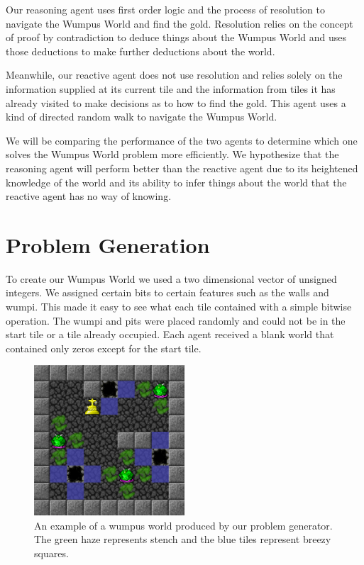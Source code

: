 \documentclass{article}
\begin{document}
		 Our reasoning agent uses first order logic and the process of resolution to navigate the Wumpus World and find the gold. Resolution relies on the concept of proof by contradiction to deduce things about the Wumpus World and uses those deductions to make further deductions about the world.
		 
		 Meanwhile, our reactive agent does not use resolution and relies solely on the information supplied at its current tile and the information from tiles it has already visited to make decisions as to how to find the gold. This agent uses a kind of directed random walk to navigate the Wumpus World.
		 
		 We will be comparing the performance of the two agents to determine which one solves the Wumpus World problem more efficiently. We hypothesize that the reasoning agent will perform better than the reactive agent due to its heightened knowledge of the world and its ability to infer things about the world that the reactive agent has no way of knowing.
		 


\section{Problem Generation}
To create our Wumpus World we used a two dimensional vector of unsigned integers. We assigned certain bits to certain features such as the walls and wumpi. This made it easy to see what each tile contained with a simple bitwise operation. The wumpi and pits were placed randomly and could not be in the start tile or a tile already occupied. Each agent received a blank world that contained only zeros except for the start tile.
\begin{figure}
	\centering
	\includegraphics[width=0.5\textwidth]{images/ex_ww}
	\caption{An example of a wumpus world produced by our problem generator. The green haze represents stench and the blue tiles represent breezy squares.}
	\label{ex_ww}
\end{figure}
\end{document}

